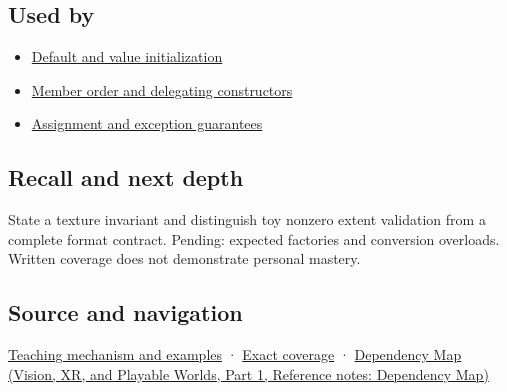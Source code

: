 \subsection{Used by}\label{appendix-7f8ec83d0886-used-by}

\hypertarget{appendix-7f8ec83d0886-used-by}{}

\begin{itemize}
\tightlist
\item
  \hyperref[appendix-ba8c1a9fe03f]{Default and value initialization}
\item
  \hyperref[appendix-3cb49709605a]{Member order and delegating constructors}
\item
  \hyperref[appendix-bea6beb5350f]{Assignment and exception guarantees}
\end{itemize}

\subsection{Recall and next depth}\label{appendix-7f8ec83d0886-recall-and-next-depth}

\hypertarget{appendix-7f8ec83d0886-recall-and-next-depth}{}

State a texture invariant and distinguish toy nonzero extent validation from a complete format contract. Pending: expected factories and conversion overloads. Written coverage does not demonstrate personal mastery.

\subsection{Source and navigation}\label{appendix-7f8ec83d0886-source-and-navigation}

\hypertarget{appendix-7f8ec83d0886-source-and-navigation}{}

\hyperref[01-foundations-i-ch003-construction-establishes-a-usable-state]{Teaching mechanism and examples} · \hyperref[appendix-fd090d982a15-m009---parts-127-147]{Exact coverage} · \href{../07-Vision-XR-and-Playable-Worlds-P01/main.pdf\#appendix-4ad47bdd269a}{Dependency Map (Vision, XR, and Playable Worlds, Part 1, Reference notes: Dependency Map)}
